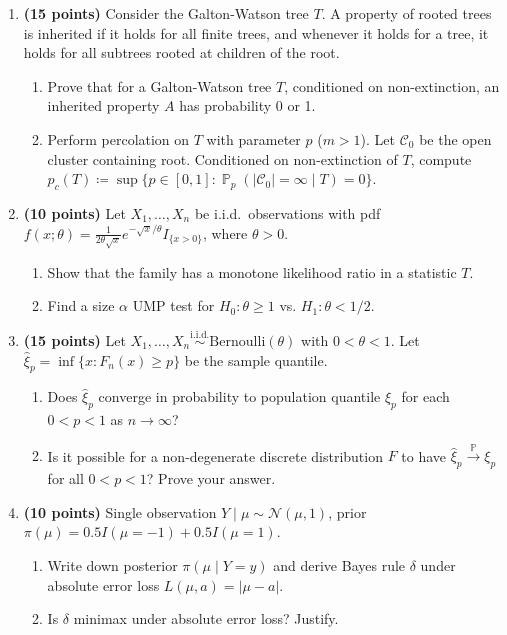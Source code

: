 \documentclass[11pt,a4paper]{article}
\DeclareMathOperator{\Pbb}{\mathbb{P}}
\begin{document}
\begin{enumerate}[label=\textbf{\arabic*.}]
    \item \textbf{(15 points)} Consider the Galton-Watson tree $T$. A property of rooted trees is inherited if it holds for all finite trees, and whenever it holds for a tree, it holds for all subtrees rooted at children of the root.
    \begin{enumerate}[label=(\alph*)]
        \item Prove that for a Galton-Watson tree $T$, conditioned on non-extinction, an inherited property $A$ has probability 0 or 1.
        \item Perform percolation on $T$ with parameter $p$ ($m > 1$). Let $\mathcal{C}_0$ be the open cluster containing root. Conditioned on non-extinction of $T$, compute $p_c(T) \coloneqq \sup \{p \in [0, 1] : \Pbb_p(|\mathcal{C}_0| = \infty \mid T) = 0\}$.
    \end{enumerate}

    \item \textbf{(10 points)} Let $X_1, \dots, X_n$ be i.i.d.\ observations with pdf $f(x; \theta) = \frac{1}{2\theta\sqrt{x}} e^{-\sqrt{x}/\theta} I_{\{x > 0\}}$, where $\theta > 0$.
    \begin{enumerate}[label=(\alph*)]
        \item Show that the family has a monotone likelihood ratio in a statistic $T$.
        \item Find a size $\alpha$ UMP test for $H_0 : \theta \ge 1$ vs. $H_1 : \theta < 1/2$.
    \end{enumerate}

    \item \textbf{(15 points)} Let $X_1, \dots, X_n \stackrel{\text{i.i.d.}}{\sim} \mathrm{Bernoulli}(\theta)$ with $0 < \theta < 1$. Let $\hat{\xi}_p = \inf\{x : F_n(x) \ge p\}$ be the sample quantile.
    \begin{enumerate}[label=(\alph*)]
        \item Does $\hat{\xi}_p$ converge in probability to population quantile $\xi_p$ for each $0 < p < 1$ as $n \to \infty$?
        \item Is it possible for a non-degenerate discrete distribution $F$ to have $\hat{\xi}_p \xrightarrow{\Pbb} \xi_p$ for all $0 < p < 1$? Prove your answer.
    \end{enumerate}

    \item \textbf{(10 points)} Single observation $Y \mid \mu \sim \mathcal{N}(\mu, 1)$, prior $\pi(\mu) = 0.5 I(\mu = -1) + 0.5 I(\mu = 1)$.
    \begin{enumerate}[label=(\alph*)]
        \item Write down posterior $\pi(\mu \mid Y = y)$ and derive Bayes rule $\delta$ under absolute error loss $L(\mu, a) = |\mu - a|$.
        \item Is $\delta$ minimax under absolute error loss? Justify.
    \end{enumerate}


\end{enumerate}
\end{document}
